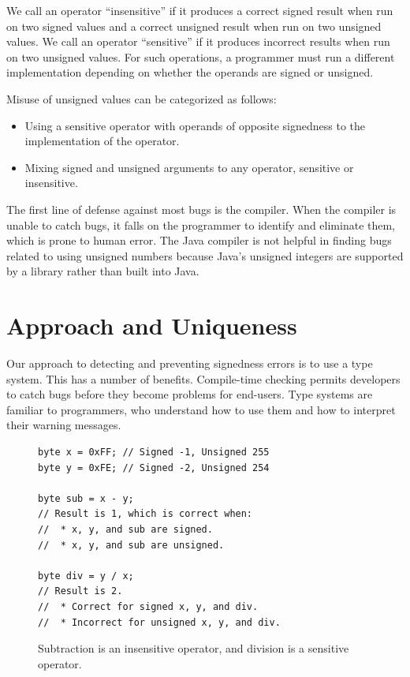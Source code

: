 \documentclass{sig-alternate-05-2015}
\begin{document}
We call an operator ``insensitive'' if it produces a correct signed result
when run on two signed values and a correct unsigned result
when run on two unsigned values.  We call an operator ``sensitive'' if it
produces incorrect results when run on two unsigned values. For such
operations, a programmer must run a different implementation depending on whether
the operands are signed or unsigned.

Misuse of unsigned values can be categorized as follows:

\begin{itemize}\itemsep 0pt \parskip 0pt
  \item Using a sensitive operator with operands of opposite signedness to the implementation of the operator.
  \item Mixing signed and unsigned arguments to any operator, sensitive or insensitive.
\end{itemize}

The first line of defense against most bugs is the compiler. When the
compiler is unable to catch bugs, it falls on the programmer to identify and
eliminate them, which is prone to human error. The Java compiler
is not helpful in finding bugs related to using unsigned
numbers because Java's unsigned
integers are supported by a library rather than built into Java.

\newpage
\section{Approach and Uniqueness}

Our approach to detecting and preventing signedness errors is to use a type
system. This has a number of benefits.
%
Compile-time checking permits developers
to catch bugs before they become problems for end-users.
%
Type systems are familiar to programmers, who understand how to use them
and how to interpret their warning messages.


\iffalse

\begin{figure}[t]
\vspace{-10pt}
\begin{lstlisting}
byte x = 0xFF; // Signed -1, Unsigned 255
byte y = 0xFE; // Signed -2, Unsigned 254

byte sub = x - y;
// Result is 1, which is correct when:
//  * x, y, and sub are signed.
//  * x, y, and sub are unsigned.

byte div = y / x;
// Result is 2.
//  * Correct for signed x, y, and div.
//  * Incorrect for unsigned x, y, and div.
\end{lstlisting}
\vspace{-10pt}
\caption{Subtraction is an insensitive operator, and
  division is a sensitive operator.}
\label{fig:operators}
\end{figure}
\end{document}
